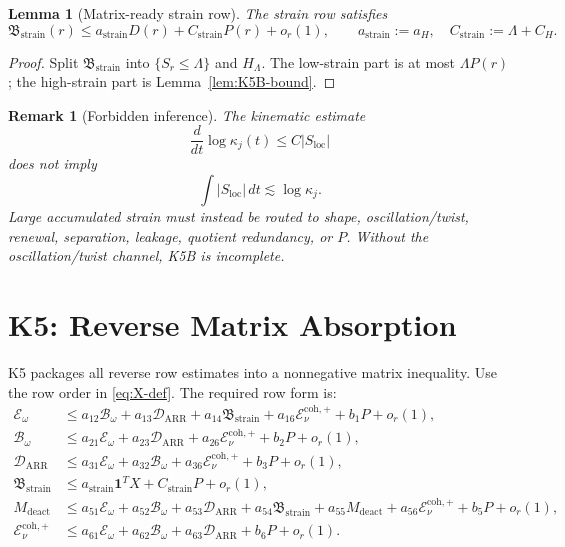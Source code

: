 \documentclass[11pt]{article}
\newtheorem{lemma}{Lemma}
\newtheorem{remark}{Remark}
\begin{document}
\begin{lemma}[Matrix-ready strain row]
\label{lem:strain-row}
The strain row satisfies
\begin{equation}
\label{eq:strain-linear}
\mathfrak B_{\mathrm{strain}}(r)
\le
a_{\mathrm{strain}}D(r)+C_{\mathrm{strain}}P(r)+o_r(1),
\qquad
a_{\mathrm{strain}}:=a_H,\quad
C_{\mathrm{strain}}:=\Lambda+C_H.
\end{equation}
\end{lemma}

\begin{proof}
Split \(\mathfrak B_{\mathrm{strain}}\) into \(\{S_r\le\Lambda\}\) and
\(H_\Lambda\).  The low-strain part is at most \(\Lambda P(r)\); the high-strain
part is Lemma~\ref{lem:K5B-bound}.
\end{proof}

\begin{remark}[Forbidden inference]
The kinematic estimate
\[
\frac{d}{dt}\log\kappa_j(t)\le C|S_{\mathrm{loc}}|
\]
does not imply
\[
\int |S_{\mathrm{loc}}|\,dt\lesssim \log\kappa_j .
\]
Large accumulated strain must instead be routed to shape, oscillation/twist,
renewal, separation, leakage, quotient redundancy, or \(P\).  Without the
oscillation/twist channel, K5B is incomplete.
\end{remark}

\clearpage
\section{K5: Reverse Matrix Absorption}
\label{sec:K5}

K5 packages all reverse row estimates into a nonnegative matrix inequality.
Use the row order in \eqref{eq:X-def}.  The required row form is:
\begin{align}
\mathcal E_\omega
&\le
a_{12}\mathcal B_\omega
+a_{13}\mathcal D_{\mathrm{ARR}}
+a_{14}\mathfrak B_{\mathrm{strain}}
+a_{16}\mathcal E_\nu^{\mathrm{coh},+}
+b_1P+o_r(1), \label{eq:row1}\\
\mathcal B_\omega
&\le
a_{21}\mathcal E_\omega
+a_{23}\mathcal D_{\mathrm{ARR}}
+a_{26}\mathcal E_\nu^{\mathrm{coh},+}
+b_2P+o_r(1), \label{eq:row2}\\
\mathcal D_{\mathrm{ARR}}
&\le
a_{31}\mathcal E_\omega
+a_{32}\mathcal B_\omega
+a_{36}\mathcal E_\nu^{\mathrm{coh},+}
+b_3P+o_r(1), \label{eq:row3}\\
\mathfrak B_{\mathrm{strain}}
&\le
a_{\mathrm{strain}}\mathbf 1^TX
+C_{\mathrm{strain}}P+o_r(1), \label{eq:row4}\\
M_{\mathrm{deact}}
&\le
a_{51}\mathcal E_\omega
+a_{52}\mathcal B_\omega
+a_{53}\mathcal D_{\mathrm{ARR}}
+a_{54}\mathfrak B_{\mathrm{strain}}
+a_{55}M_{\mathrm{deact}}
+a_{56}\mathcal E_\nu^{\mathrm{coh},+}
+b_5P+o_r(1), \label{eq:row5}\\
\mathcal E_\nu^{\mathrm{coh},+}
&\le
a_{61}\mathcal E_\omega
+a_{62}\mathcal B_\omega
+a_{63}\mathcal D_{\mathrm{ARR}}
+b_6P+o_r(1). \label{eq:row6}
\end{align}
\end{document}
